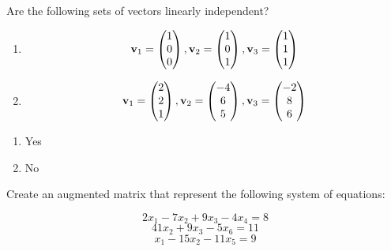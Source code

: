 \documentclass[
]{article}
\begin{document}
\newpage
\begin{exercise}
\protect\hypertarget{exr:linearindep1}{}\label{exr:linearindep1}

Are the following sets of vectors linearly independent?

\begin{enumerate}
\def\labelenumi{\arabic{enumi}.}
\item
  \[{\bf v}_1 = \begin{pmatrix} 1 \\ 0 \\ 0 \end{pmatrix} , {\bf v}_2 = \begin{pmatrix} 1 \\ 0 \\ 1 \end{pmatrix} , {\bf v}_3 = \begin{pmatrix} 1 \\ 1 \\ 1 \end{pmatrix} \]
\item
  \[{\bf v}_1 = \begin{pmatrix} 2 \\ 2 \\ 1 \end{pmatrix} , {\bf v}_2 = \begin{pmatrix} -4 \\ 6 \\ 5 \end{pmatrix} , {\bf v}_3 = \begin{pmatrix} -2 \\ 8 \\ 6 \end{pmatrix} \]
\end{enumerate}

\end{exercise}

\begin{answer}
\noindent
\begin{enumerate}
\item Yes
\item No
\end{enumerate}
\end{answer}

\begin{exercise}
\protect\hypertarget{exr:augmatrix}{}\label{exr:augmatrix}Create an augmented matrix that represent the following system of equations:

\[2x_1 -7x_2 + 9x_3 -4x_4 = 8\]
\[41x_2 + 9x_3 -5x_6 = 11\]
\[x_1 -15x_2 -11x_5 = 9\]
\end{exercise}
\end{document}
